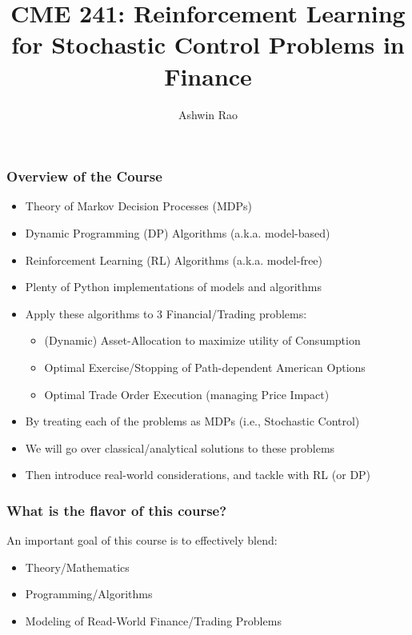\documentclass{beamer}
\title[RL for Finance]{CME 241: Reinforcement Learning for Stochastic Control Problems in Finance} %
\author{Ashwin Rao} %
\institute[Stanford] %
{ICME, Stanford University
}
\date{} %
\begin{document}
\begin{frame}
\titlepage %
\end{frame}


\begin{frame}
\frametitle{Overview of the Course}
\begin{itemize}
\item Theory of Markov Decision Processes (MDPs)
\item Dynamic Programming (DP) Algorithms (a.k.a. model-based)
\item Reinforcement Learning (RL) Algorithms (a.k.a. model-free)
\item Plenty of Python implementations of models and algorithms
\item Apply these algorithms to 3 Financial/Trading problems:
\begin{itemize}
\item (Dynamic) Asset-Allocation to maximize utility of Consumption
\item Optimal Exercise/Stopping of Path-dependent American Options
\item Optimal Trade Order Execution (managing Price Impact)
\end{itemize}
\item By treating each of the problems as MDPs (i.e., Stochastic Control)
\item We will go over classical/analytical solutions to these problems
\item Then introduce real-world considerations, and tackle with RL (or DP)
\end{itemize}
\end{frame}

\begin{frame}
\frametitle{What is the flavor of this course?}
An important goal of this course is to effectively blend:
\begin{itemize}
\item Theory/Mathematics
\item Programming/Algorithms
\item Modeling of Read-World Finance/Trading Problems
\end{itemize}
\end{frame}
\end{document}
